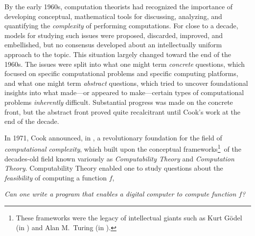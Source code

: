{By the early 1960s, computation theorists had recognized the importance of developing conceptual, mathematical tools for discussing, analyzing, and quantifying the {\em complexity} of performing computations.  For close to a decade, models for studying such issues were proposed, discarded, improved, and embellished, but no consensus developed about an intellectually uniform approach to the topic.  This situation largely changed toward the end of the 1960s.  The issues were split into what one might term {\em concrete} questions, which focused on specific computational problems and specific computing platforms, and what one might term {\em abstract} questions, which tried to uncover foundational insights into what made---or appeared to make---certain types of computational problems {\em inherently} difficult.  Substantial progress was made on the concrete front, but the abstract front proved quite recalcitrant until Cook's work at the end of the decade.

\medskip

 
In 1971, Cook announced, in \cite{Cook71}, a revolutionary foundation for the field of {\it computational complexity}, which built upon the conceptual frameworks\footnote{These frameworks were the legacy of intellectual giants such as Kurt G\"{o}del (in \cite{Goedel31}) and Alan M.~Turing (in \cite{Turing36}).}~of the decades-old field known variously as {\it Computability Theory}  and {\it Computation Theory}.   Computability Theory enabled one to study questions about the {\em feasibility} of computing a function $f$,

\smallskip

\noindent
{\it Can one write a program that enables a digital computer to compute function $f$?}

\smallskip


}
